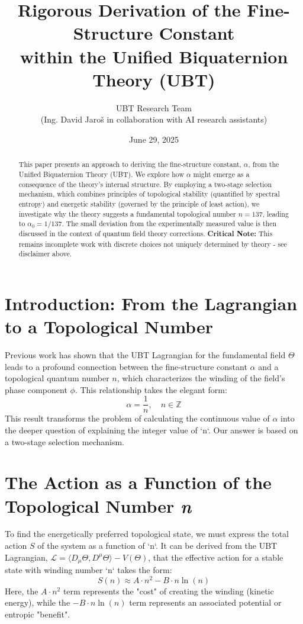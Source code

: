 \documentclass[12pt, a4paper]{article}
\title{Rigorous Derivation of the Fine-Structure Constant \\ within the Unified Biquaternion Theory (UBT)}
\author{UBT Research Team \\ \small(Ing. David Jaroš in collaboration with AI research assistants)}
\date{June 29, 2025}
\begin{document}
\maketitle


\AlphaDerivationDisclaimer

\begin{abstract}
This paper presents an approach to deriving the fine-structure constant, \( \alpha \), from the Unified Biquaternion Theory (UBT). We explore how \( \alpha \) might emerge as a consequence of the theory's internal structure. By employing a two-stage selection mechanism, which combines principles of topological stability (quantified by spectral entropy) and energetic stability (governed by the principle of least action), we investigate why the theory suggests a fundamental topological number \( n=137 \), leading to \( \alpha_0 = 1/137 \). The small deviation from the experimentally measured value is then discussed in the context of quantum field theory corrections. \textbf{Critical Note:} This remains incomplete work with discrete choices not uniquely determined by theory - see disclaimer above.
\end{abstract}

\section{Introduction: From the Lagrangian to a Topological Number}

Previous work has shown that the UBT Lagrangian for the fundamental field \( \Theta \) leads to a profound connection between the fine-structure constant \( \alpha \) and a topological quantum number \( n \), which characterizes the winding of the field's phase component \( \phi \). This relationship takes the elegant form:
\begin{equation}
    \alpha = \frac{1}{n}, \quad n \in \mathbb{Z}
\end{equation}
This result transforms the problem of calculating the continuous value of \( \alpha \) into the deeper question of explaining the integer value of `n`. Our answer is based on a two-stage selection mechanism.

\section{The Action as a Function of the Topological Number \textit{n}}

To find the energetically preferred topological state, we must express the total action \( S \) of the system as a function of `n`. It can be derived from the UBT Lagrangian, \( \mathcal{L} = \langle D_\mu \Theta, D^\mu \Theta \rangle - V(\Theta) \), that the effective action for a stable state with winding number `n` takes the form:
\begin{equation}
    S(n) \approx A \cdot n^2 - B \cdot n \ln(n)
    \label{eq:action}
\end{equation}
Here, the \( A \cdot n^2 \) term represents the "cost" of creating the winding (kinetic energy), while the \( -B \cdot n \ln(n) \) term represents an associated potential or entropic "benefit".
\end{document}
